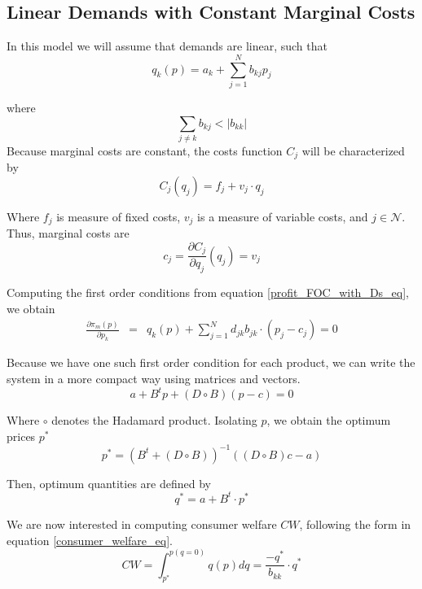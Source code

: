 \documentclass[12pt]{article}
\begin{document}
\subsection{Linear Demands with Constant Marginal Costs}

In this model we will assume that demands are linear, such that
\begin{equation*}
q_k(p) = a_k + \sum_{j=1}^N b_{kj}p_j
\end{equation*}

where
\begin{equation*}
\sum_{j \neq k} b_{kj} < |b_{kk}|
\end{equation*}
Because marginal costs are constant, the costs function $C_j$ will be characterized by
\begin{equation*}
C_j (q_j)= f_j + v_j \cdot q_j
\end{equation*}

Where $f_j$ is measure of fixed costs, $v_j$ is a measure of variable costs, and  $j \in \mathcal{N}$. Thus, marginal costs are
\begin{equation*}
c_j = \frac{\partial C_j}{\partial q_j}(q_j) = v_j
\end{equation*}

Computing the first order conditions from equation \ref{profit_FOC_with_Ds_eq}, we obtain
\begin{eqnarray*}
\frac{\partial\pi_m(p)}{\partial p_k}
&=& q_k(p) + \sum_{j = 1}^N d_{jk}b_{jk} \cdot (p_j - c_j) = 0
\end{eqnarray*}

Because we have one such first order condition for each product, we can write the system in a more compact way using matrices and vectors.
\begin{equation*}
a + B^t p + (D \circ B)(p - c) = 0
\end{equation*}

Where $\circ$ denotes the Hadamard product.
Isolating $p$, we obtain the optimum prices $p^*$
\begin{equation*}
p^* = (B^t + (D \circ B))^{-1}((D \circ B) c - a)
\end{equation*}

Then, optimum quantities are defined by
\begin{equation*}
q^* = a + B^t \cdot p^*
\end{equation*}

We are now interested in computing consumer welfare $CW$, following the form in equation \ref{consumer_welfare_eq}. 
\begin{equation*}
CW = \int_{p^*}^{p(q = 0)} q(p) dq = \frac{-q^*}{b_{kk}} \cdot q^*
\end{equation*}
\end{document}
